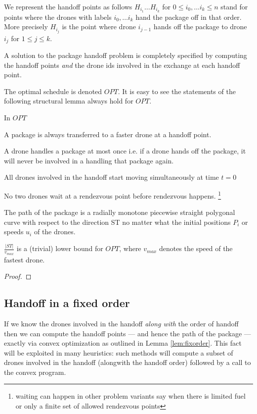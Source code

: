 \documentclass[12pt, english, oneside]{report}
\begin{document}
We represent the handoff points as follows $H_{i_1} \ldots H_{i_k}$ for $0 \leq i_0, \ldots i_k \leq n$ stand 
for points where the drones with labels $i_0, \ldots i_k$ hand the package off in that order. More precisely 
$H_{i_j}$ is the point where drone $i_{j-1}$ hands off the package to drone $i_j$ for $1 \leq j \leq k$.  

A solution to the package handoff problem is completely specified by computing the handoff points \textit{and} the 
drone ids involved in the exchange at each handoff point. 

The optimal schedule is denoted $OPT$. It is easy to see the statements of the following structural lemma always 
hold for $OPT$. 

\begin{flem}

In $OPT$
\begin{alphalist}
\item A package is always transferred to a faster drone at a handoff point. 
\item A drone handles a package at most once i.e. if a drone hands off the package, 
      it will never be involved in a handling that package again. 
\item All drones involved in the handoff start moving simultaneously at time $t=0$ 
\item No two drones wait at a rendezvous point before rendezvous happens. 
     \footnote{waiting can happen in other problem variants 
     say when there is limited fuel or only a finite set of 
     allowed rendezvous points}
\item The path of the package is a radially monotone piecewise straight polygonal curve with respect to the 
    direction ST no matter what the initial positions $P_i$ or speeds $u_i$ of the drones. 
\item $\frac{|ST|}{v_{max}}$ is a (trivial) lower bound for $OPT$, where $v_{max}$ denotes the speed of the fastest drone. 
\end{alphalist}
\end{flem}

\begin{proof}
\end{proof}

\newpage
\subsection{Handoff in a fixed order}
\label{ssec:fixorder}
If we know the drones involved in the handoff \textit{along with} the order of handoff 
then we can compute the handoff points --- and hence the path of the package --- exactly via 
convex optimization as outlined in Lemma \autoref{lem:fixorder}. This fact will be exploited in many 
heuristics: such methods will compute a subset of drones involved in the handoff (alongwith 
the handoff order) followed by a call to the convex program. 
\end{document}
